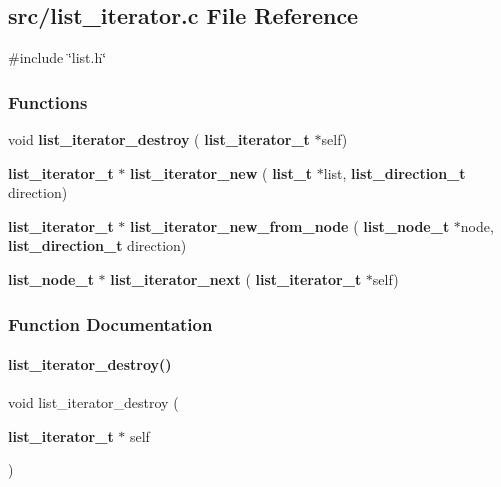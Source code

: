 \subsection{src/list\+\_\+iterator.c File Reference}
\label{list__iterator_8c}
{\ttfamily \#include \char`\"{}list.\+h\char`\"{}}\newline
\subsubsection*{Functions}
\begin{DoxyCompactItemize}
\item 
void \textbf{ list\+\_\+iterator\+\_\+destroy} (\textbf{ list\+\_\+iterator\+\_\+t} $\ast$self)
\item 
\textbf{ list\+\_\+iterator\+\_\+t} $\ast$ \textbf{ list\+\_\+iterator\+\_\+new} (\textbf{ list\+\_\+t} $\ast$list, \textbf{ list\+\_\+direction\+\_\+t} direction)
\item 
\textbf{ list\+\_\+iterator\+\_\+t} $\ast$ \textbf{ list\+\_\+iterator\+\_\+new\+\_\+from\+\_\+node} (\textbf{ list\+\_\+node\+\_\+t} $\ast$node, \textbf{ list\+\_\+direction\+\_\+t} direction)
\item 
\textbf{ list\+\_\+node\+\_\+t} $\ast$ \textbf{ list\+\_\+iterator\+\_\+next} (\textbf{ list\+\_\+iterator\+\_\+t} $\ast$self)
\end{DoxyCompactItemize}


\subsubsection{Function Documentation}
\mbox{\label{list__iterator_8c_ad16fa29ddbb444070ea65f871e1c0ba2}} 
\paragraph{list\+\_\+iterator\+\_\+destroy()}
{\footnotesize\ttfamily void list\+\_\+iterator\+\_\+destroy (\begin{DoxyParamCaption}\item[{\textbf{ list\+\_\+iterator\+\_\+t} $\ast$}]{self }\end{DoxyParamCaption})}




